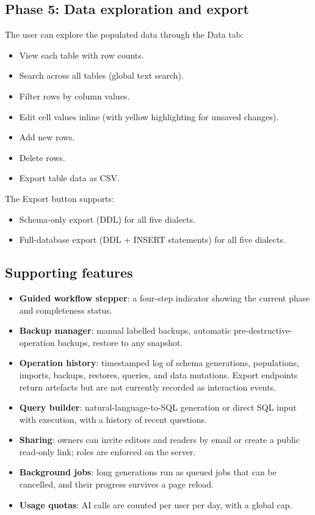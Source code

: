 \documentclass[11pt,a4paper]{article}
\begin{document}
\subsection{Phase 5: Data exploration and export}
The user can explore the populated data through the Data tab:
\begin{itemize}
  \item View each table with row counts.
  \item Search across all tables (global text search).
  \item Filter rows by column values.
  \item Edit cell values inline (with yellow highlighting for unsaved changes).
  \item Add new rows.
  \item Delete rows.
  \item Export table data as CSV.
\end{itemize}
The Export button supports:
\begin{itemize}
  \item Schema-only export (DDL) for all five dialects.
  \item Full-database export (DDL + INSERT statements) for all five dialects.
\end{itemize}

\subsection{Supporting features}
\begin{itemize}
  \item \textbf{Guided workflow stepper}: a four-step indicator showing the current phase and completeness status.
  \item \textbf{Backup manager}: manual labelled backups, automatic pre-destructive-operation backups, restore to any snapshot.
  \item \textbf{Operation history}: timestamped log of schema generations, populations, imports, backups, restores, queries, and data mutations. Export endpoints return artefacts but are not currently recorded as interaction events.
  \item \textbf{Query builder}: natural-language-to-SQL generation or direct SQL input with execution, with a history of recent questions.
  \item \textbf{Sharing}: owners can invite editors and readers by email or create a public read-only link; roles are enforced on the server.
  \item \textbf{Background jobs}: long generations run as queued jobs that can be cancelled, and their progress survives a page reload.
  \item \textbf{Usage quotas}: AI calls are counted per user per day, with a global cap.
\end{itemize}
\end{document}
